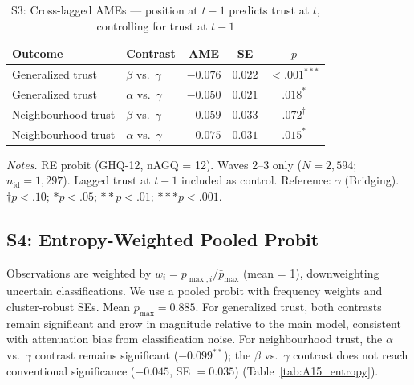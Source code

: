\documentclass[12pt, a4paper]{article}
\newcommand{\tablenote}[1]{\vspace{4pt}\par\footnotesize\textit{Notes.} #1}
\begin{document}
\begin{table}[H]
\centering
\caption{S3: Cross-lagged AMEs --- position at $t-1$ predicts trust at $t$, controlling for trust at $t-1$}
\label{tab:A14_crosslag}
\small
\begin{tabular}{llccc}
\hline\hline
  Outcome & Contrast & AME & SE & $p$ \\
\hline
  Generalized trust   & $\beta$ vs.\ $\gamma$ & $-0.076$ & $0.022$ & $<.001^{***}$ \\
  Generalized trust   & $\alpha$ vs.\ $\gamma$ & $-0.050$ & $0.021$ & $.018^{*}$ \\
  Neighbourhood trust & $\beta$ vs.\ $\gamma$ & $-0.059$ & $0.033$ & $.072^{\dagger}$ \\
  Neighbourhood trust & $\alpha$ vs.\ $\gamma$ & $-0.075$ & $0.031$ & $.015^{*}$ \\
\hline\hline
\end{tabular}
\tablenote{RE probit (GHQ-12, nAGQ = 12). Waves 2--3 only
($N = 2{,}594$; $n_{\text{id}} = 1{,}297$). Lagged trust at $t-1$ included
as control. Reference: $\gamma$ (Bridging).
$\dagger p<.10$; $* p<.05$; $** p<.01$; $*** p<.001$.}
\end{table}

\subsection{S4: Entropy-Weighted Pooled Probit}
\label{sec:s4}

Observations are weighted by $w_i = p_{\max,i} / \bar{p}_{\max}$ (mean = 1),
downweighting uncertain classifications. We use a pooled probit with frequency
weights and cluster-robust SEs. Mean $p_{\max} = 0.885$. For generalized
trust, both contrasts remain significant and grow in magnitude relative to the
main model, consistent with attenuation bias from classification noise.
For neighbourhood trust, the $\alpha$ vs.\ $\gamma$ contrast remains
significant ($-0.099^{**}$); the $\beta$ vs.\ $\gamma$ contrast does not
reach conventional significance ($-0.045$, SE $= 0.035$)
(Table~\ref{tab:A15_entropy}).
\end{document}
